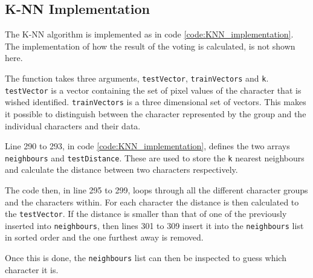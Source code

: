 \subsection{K-NN Implementation}
The K-NN algorithm is implemented as in code \ref{code:KNN_implementation}.
The implementation of how the result of the voting is calculated, is not shown here.





The function takes three arguments, \texttt{testVector}, \texttt{trainVectors} and \texttt{k}. 
\texttt{testVector} is a vector containing the set of pixel values of the character that is wished identified. 
\texttt{trainVectors} is a three dimensional set of vectors. 
This makes it possible to distinguish between the character represented by the group and the individual characters and their data.

Line 290 to 293, in code \ref{code:KNN_implementation}, defines the two arrays \texttt{neighbours} and \texttt{testDistance}.
These are used to store the \texttt{k} nearest neighbours and calculate the distance between two characters respectively.

The code then, in line 295 to 299, loops through all the different character groups and the characters within.
For each character the distance is then calculated to the \texttt{testVector}.
If the distance is smaller than that of one of the previously inserted into \texttt{neighbours}, 
then lines 301 to 309 insert it into the \texttt{neighbours} list in sorted order and the one furthest away is removed.

Once this is done, the \texttt{neighbours} list can then be inspected to guess which character it is.